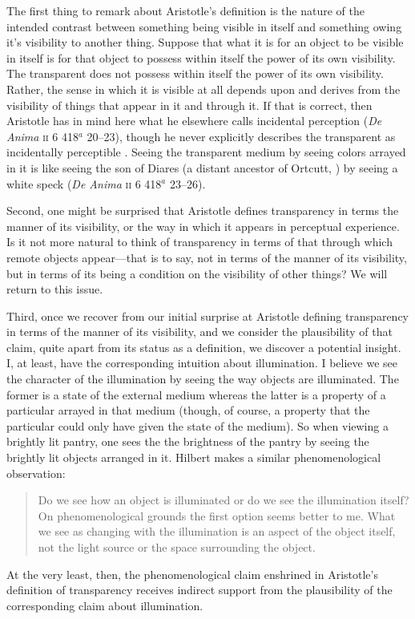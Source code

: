 The first thing to remark about Aristotle's definition is the nature of the intended contrast between something being visible in itself and something owing it's visibility to another thing. Suppose that what it is for an object to be visible in itself is for that object to possess within itself the power of its own visibility. The transparent does not possess within itself the power of its own visibility. Rather, the sense in which it is visible at all depends upon and derives from the visibility of things that appear in it and through it. If that is correct, then Aristotle has in mind here what he elsewhere calls incidental perception (\emph{De Anima} \textsc{ii} 6 418\( ^{a} \) 20--23), though he never explicitly describes the transparent as incidentally perceptible \citep[260]{Polansky:2007ly}. Seeing the transparent medium by seeing colors arrayed in it is like seeing the son of Diares (a distant ancestor of Ortcutt, \citealt{Quine:1956qp}) by seeing a white speck (\emph{De Anima} \textsc{ii} 6 418\( ^{a} \) 23--26).

Second, one might be surprised that Aristotle defines transparency in terms the manner of its visibility, or the way in which it appears in perceptual experience. Is it not more natural to think of transparency in terms of that through which remote objects appear---that is to say, not in terms of the manner of its visibility, but in terms of its being a condition on the visibility of other things? We will return to this issue.

Third, once we recover from our initial surprise at Aristotle defining transparency in terms of the manner of its visibility, and we consider the plausibility of that claim, quite apart from its status as a definition, we discover a potential insight. I, at least, have the corresponding intuition about illumination. I believe we see the character of the illumination by seeing the way objects are illuminated. The former is a state of the external medium whereas the latter is a property of a particular arrayed in that medium (though, of course, a property that the particular could only have given the state of the medium). So when viewing a brightly lit pantry, one sees the the brightness of the pantry by seeing the brightly lit objects arranged in it.  Hilbert makes a similar phenomenological observation:
\begin{quote}
	Do we see how an object is illuminated or do we see the illumination itself? On phenomenological grounds the first option seems better to me. What we see as changing with the illumination is an aspect of the object itself, not the light source or the space surrounding the object. \citep[150--151]{Hilbert:2007qy}
\end{quote}
At the very least, then, the phenomenological claim enshrined in Aristotle's definition of transparency receives indirect support from the plausibility of the corresponding claim about illumination.

